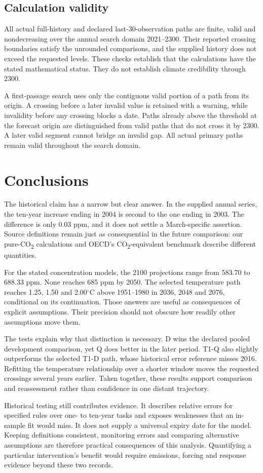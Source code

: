 \documentclass[11pt,a4paper]{article}
\newcommand{\p}[2]{#2\par}
\newcommand{\CO}{CO\textsubscript{2}}
\newcommand{\degC}{\ensuremath{{}^{\circ}\mathrm{C}}}
\begin{document}
\subsection{Calculation validity}
\p{APP03}{All actual full-history and declared last-30-observation paths are finite, valid and nondecreasing over the annual search domain 2021--2300. Their reported crossing boundaries satisfy the unrounded comparisons, and the supplied history does not exceed the requested levels. These checks establish that the calculations have the stated mathematical status. They do not establish climate credibility through 2300.}
\p{APP04}{A first-passage search uses only the contiguous valid portion of a path from its origin. A crossing before a later invalid value is retained with a warning, while invalidity before any crossing blocks a date. Paths already above the threshold at the forecast origin are distinguished from valid paths that do not cross it by 2300. A later valid segment cannot bridge an invalid gap. All actual primary paths remain valid throughout the search domain.}
\clearpage
\section{Conclusions}\label{sec:conclusion}
\p{CON01}{The historical claim has a narrow but clear answer. In the supplied annual series, the ten-year increase ending in 2004 is second to the one ending in 2003. The difference is only 0.03 ppm, and it does not settle a March-specific assertion. Source definitions remain just as consequential in the future comparison: our pure-\CO{} calculations and OECD's \CO{}-equivalent benchmark describe different quantities.}
\p{CON02}{For the stated concentration models, the 2100 projections range from 583.70 to 688.33 ppm. None reaches 685 ppm by 2050. The selected temperature path reaches 1.25, 1.50 and 2.00\degC{} above 1951--1980 in 2036, 2048 and 2076, conditional on its continuation. Those answers are useful as consequences of explicit assumptions. Their precision should not obscure how readily other assumptions move them.}
\p{CON03}{The tests explain why that distinction is necessary. D wins the declared pooled development comparison, yet Q does better in the later period. T1-Q also slightly outperforms the selected T1-D path, whose historical error reference misses 2016. Refitting the temperature relationship over a shorter window moves the requested crossings several years earlier. Taken together, these results support comparison and reassessment rather than confidence in one distant trajectory.}
\p{CON04}{Historical testing still contributes evidence. It describes relative errors for specified rules over one- to ten-year tasks and exposes weaknesses that an in-sample fit would miss. It does not supply a universal expiry date for the model. Keeping definitions consistent, monitoring errors and comparing alternative assumptions are therefore practical consequences of this analysis. Quantifying a particular intervention's benefit would require emissions, forcing and response evidence beyond these two records.}
\clearpage
\end{document}
